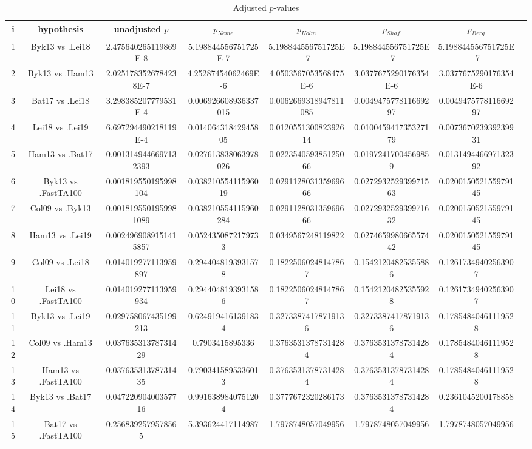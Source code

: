 \documentclass[a4paper,10pt]{article}
\begin{document}
\begin{landscape}
\begin{table}[!htp]
\centering\tiny
\caption{Adjusted $p$-values}
\begin{tabular}{cccccccc}
i&hypothesis&unadjusted $p$&$p_{Neme}$&$p_{Holm}$&$p_{Shaf}$&$p_{Berg}$\\
\hline
1&Byk13 vs .Lei18&2.475640265119869E-8&5.198844556751725E-7&5.198844556751725E-7&5.198844556751725E-7&5.198844556751725E-7\\
2&Byk13 vs .Ham13&2.0251783526784238E-7&4.25287454062469E-6&4.0503567053568475E-6&3.0377675290176354E-6&3.0377675290176354E-6\\
3&Bat17 vs .Lei18&3.298385207779531E-4&0.006926608936337015&0.0062669318947811085&0.004947577811669297&0.004947577811669297\\
4&Lei18 vs .Lei19&6.697294490218119E-4&0.01406431842945805&0.012055130082392614&0.010045941735327179&0.007367023939239931\\
5&Ham13 vs .Bat17&0.0013149446697132393&0.027613838063978026&0.022354059385125066&0.01972417004569859&0.013149446697132392\\
6&Byk13 vs .FastTA100&0.001819550195998104&0.03821055411596019&0.029112803135969666&0.027293252939971563&0.020015052155979145\\
7&Col09 vs .Byk13&0.0018195501959981089&0.038210554115960284&0.029112803135969666&0.027293252939971632&0.020015052155979145\\
8&Ham13 vs .Lei19&0.0024969089151415857&0.0524350872179733&0.0349567248119822&0.027465998066557442&0.020015052155979145\\
9&Col09 vs .Lei18&0.014019277113959897&0.2944048193931578&0.18225060248147867&0.15421204825355886&0.12617349402563907\\
10&Lei18 vs .FastTA100&0.014019277113959934&0.2944048193931586&0.18225060248147867&0.15421204825355928&0.12617349402563907\\
11&Byk13 vs .Lei19&0.029758067435199213&0.6249194161391834&0.32733874178719136&0.32733874178719136&0.17854840461119528\\
12&Col09 vs .Ham13&0.03763531378731429&0.7903415895336&0.37635313787314284&0.37635313787314284&0.17854840461119528\\
13&Ham13 vs .FastTA100&0.03763531378731435&0.7903415895336013&0.37635313787314284&0.37635313787314284&0.17854840461119528\\
14&Byk13 vs .Bat17&0.04722090400357716&0.9916389840751204&0.3777672320286173&0.37635313787314284&0.2361045200178858\\
15&Bat17 vs .FastTA100&0.2568392579578565&5.393624417114987&1.7978748057049956&1.7978748057049956&1.7978748057049956\\

\end{tabular}
\end{table}
\end{landscape}
\end{document}
